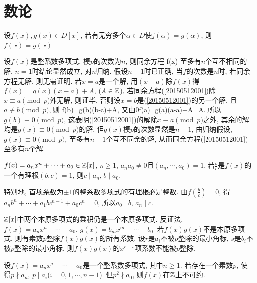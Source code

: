 
\section{数论}
设$f(x),g(x)\in D[x]$, 若有无穷多个$\alpha\in D$使$f(\alpha)=g(\alpha)$, 则$f(x)=g(x)$.
\et

设$f(x)$是整系数多项式, 模$p$的次数为$n$, 则同余方程
\be\label{20150512001}
f(x)
\ee
至多有$n$个互不相同的解.
\et
\ba
$n=1$时结论显然成立, 对$n$归纳. 假设$n-1$时已正确, 当$f$的次数是$n$时, 若同余方程无解, 则无需证明.
若$x=a$是一个解, 用$(x-a)$除$f(x)$得$f(x)=g(x)(x-a)+A$, ($A\in\Bbb Z$), 若同余方程(\ref{20150512001})除$x\equiv a\pmod{p}$外无解, 则证毕, 
否则设$x=b$是(\ref{20150512001})的另一个解, 且$a\not\equiv b\pmod{p}$, 则
\equiv f(b)=g(b)(b-a)+A, \textrm{又由}0\equiv f(a)=g(a)(a-a)+A=A.
\eee
所以$g(b)\equiv0\pmod{p}$, 这表明(\ref{20150512001})的解除$x\equiv a\pmod{p}$之外, 其余的解均是$g(x)\equiv0\pmod{p}$的解, 
但$g(x)$模$p$的次数显然是$n-1$, 由归纳假设, $g(x)\equiv 0\pmod{p}$, 至多有$n-1$个互不同余的解, 从而同余方程(\ref{20150512001})至多有$n$个解.
\ea

$f(x)=a_nx^n+\cdots+a_0\in\Bbb Z[x]$, $n\ge1$, $a_na_0\ne0$且$(a_n,\cdots, a_0)=1$, 若$\frac{b}{c}$是$f(x)$的一个有理根$(b,c)=1$, 
则$c\mid a_n$, $b\mid a_0$.

特别地, 首项系数为$\pm 1$的整系数多项式的有理根必是整数.
\et
\ba
由$f\left(\frac{b}{c}\right)=0$, 得$a_nb^n+\cdots+a_1bc^{n-1}+a_0c^n=0$, 所以$a_0\mid b$, $a_n\mid c$.

{\color{red}{一种证明有理数是整数的证明途径: 证复数是整数, 先证其是有理数, 且找到作为零点的首一多项式.}}
\ea

$\Bbb Z[x]$中两个本原多项式的乘积仍是一个本原多项式.
\et
\ba
反证法, $f(x)=a_nx^n+\cdots+a_0$, $g(x)=b_mx^m+\cdots+b_0$, 若$f(x)g(x)$不是本原多项式, 则有素数$p$整除$f(x)g(x)$的所有系数.
设$r$是$a_i$不被$p$整除的最小角标, $s$是$b_i$不被$p$整除的最小角标, 则$f(x)g(x)$的$x^{r+s}$项系数不能被$p$整除.
\ea

设$f(x)=a_nx^n+\cdots+a_0$是一个整系数多项式, 其中$n\ge1$. 若存在一个素数$p$, 使得$p\nmid a_n$, $p\mid a_i$($i=0,1,\cdots,n-1$), 
但$p^2\nmid a_0$, 则$f(x)$在$\Bbb Z$上不可约.
\et

